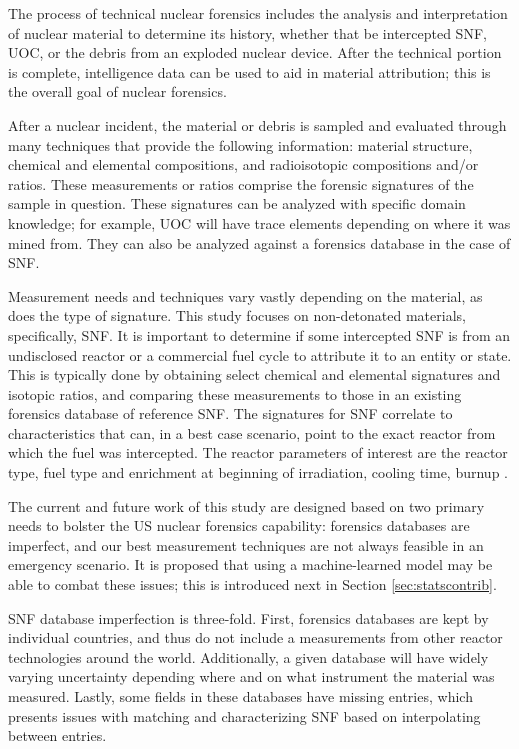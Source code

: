 The process of technical nuclear forensics includes the analysis and
interpretation of nuclear material to determine its history, whether that be
intercepted \gls{SNF}, \gls{UOC}, or the debris from an exploded nuclear
device. After the technical portion is complete, intelligence data can be used
to aid in material attribution; this is the overall goal of nuclear forensics. 

After a nuclear incident, the material or debris is sampled and evaluated
through many techniques that provide the following information: material
structure, chemical and elemental compositions, and radioisotopic compositions
and/or ratios.  These measurements or ratios comprise the forensic signatures
of the sample in question. These signatures can be analyzed with specific
domain knowledge; for example, \gls{UOC} will have trace elements depending on
where it was mined from.  They can also be analyzed against a forensics
database in the case of \gls{SNF}.

Measurement needs and techniques vary vastly depending on the material, as does
the type of signature. This study focuses on non-detonated materials,
specifically, \gls{SNF}. It is important to determine if some intercepted
\gls{SNF} is from an undisclosed reactor or a commercial fuel cycle to
attribute it to an entity or state. This is typically done by obtaining select
chemical and elemental signatures and isotopic ratios, and comparing these
measurements to those in an existing forensics database of reference \gls{SNF}.
The signatures for \gls{SNF} correlate to characteristics that can, in a best
case scenario, point to the exact reactor from which the fuel was intercepted.
The reactor parameters of interest are the reactor type, fuel type and
enrichment at beginning of irradiation, cooling time, burnup \cite{weber_2006,
weber_2010, weber_2011}.

The current and future work of this study are designed based on two primary
needs to bolster the \gls{US} nuclear forensics capability: forensics databases
are imperfect, and our best measurement techniques are not always feasible in
an emergency scenario. It is proposed that using a machine-learned model may be
able to combat these issues; this is introduced next in Section
\ref{sec:statscontrib}. 

\gls{SNF} database imperfection is three-fold. First, forensics databases are
kept by individual countries, and thus do not include a measurements from other
reactor technologies around the world. Additionally, a given database will have
widely varying uncertainty depending where and on what instrument the material
was measured. Lastly, some fields in these databases have missing entries,
which presents issues with matching and characterizing \gls{SNF} based on
interpolating between entries. 

